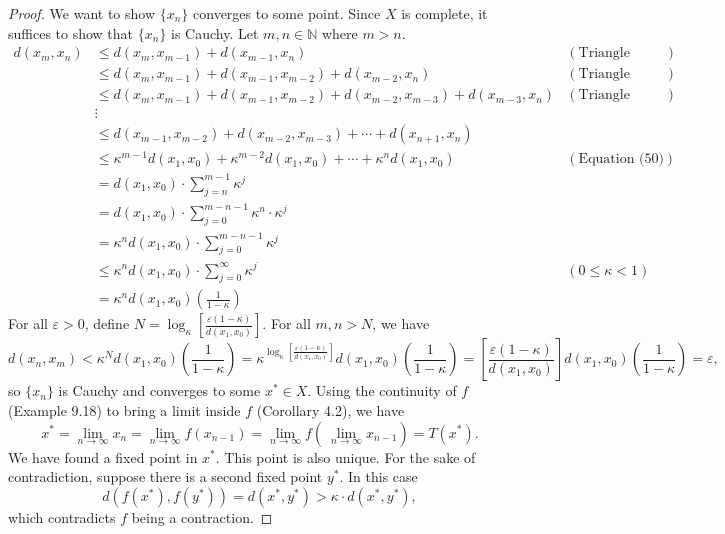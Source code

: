 \documentclass{article}
\newcommand{\N}{\mathbb{N}}
\theoremstyle{definition}
\begin{document}
\begin{proof}
		We want to show $ \{x_n\} $ converges to some point. Since $ X $ is complete, it suffices to show that $ \{x_n\}  $ is Cauchy. Let $ m,n\in\N $ where $ m > n $. 
		\begin{align*}
			d(x_m,x_n) &\le d(x_m,x_{m-1}) + d(x_{m-1}, x_n) &(\text{Triangle Inequality})\\  & \le d(x_m,x_{m-1}) + d(x_{m-1}, x_{m-2})+ d(x_{m-2}, x_n)&(\text{Triangle Inequality})\\
			&  \le d(x_m,x_{m-1}) + d(x_{m-1}, x_{m-2})+  d(x_{m-2}, x_{m-3})+ d(x_{m-3}, x_n)&(\text{Triangle Inequality})\\ & \vdots  \\  & \le  d(x_{m-1}, x_{m-2}) +d(x_{m-2}, x_{m-3})  +  \cdots + d(x_{n+1}, x_n) \\  &\le   \kappa^{m-1}d(x_1, x_0) +  \kappa^{m-2}d(x_1, x_0) + \cdots +  \kappa^{n}d(x_1, x_0)&(\text{Equation (50)})\\ & = d(x_1,x_0)\cdot \textstyle\sum_{j=n}^{m-1}\kappa^j \\ 
			& = d(x_1,x_0)\cdot \textstyle\sum_{j=0}^{m-n-1}\kappa^n\cdot \kappa^j \\
			& = \kappa^nd(x_1,x_0)\cdot \textstyle\sum_{j=0}^{m-n-1}\kappa^j  \\
			& \le \kappa^nd(x_1,x_0)\cdot \textstyle\sum_{j=0}^{\infty}\kappa^j& (0\le \kappa < 1)\\
			& = \kappa^nd(x_1,x_0)\left(\frac{1}{1-\kappa}\right)
		\end{align*}
		For all $ \varepsilon > 0 $, define $ N = \log_\kappa\left[\frac{\varepsilon(1-\kappa)}{d(x_1,x_0)}\right] $. For all $ m,n > N $, we have 
		$$ d(x_n,x_m) < \kappa^Nd(x_1,x_0)\left(\frac{1}{1-\kappa}\right) = \kappa^{\log_\kappa\left[\frac{\varepsilon(1-\kappa)}{d(x_1,x_0)}\right] }d(x_1,x_0)\left(\frac{1}{1-\kappa}\right) = \left[\frac{\varepsilon(1-\kappa)}{d(x_1,x_0)}\right]d(x_1,x_0)\left(\frac{1}{1-\kappa}\right) = \varepsilon, $$ so $ \{x_n\} $ is Cauchy and converges to some $ x^*\in X $. Using the continuity of $ f $ (Example 9.18) to bring a limit inside $ f $ (Corollary 4.2), we have $$ x^* = \lim\limits_{n\to\infty} x_n = \lim\limits_{n\to\infty} f(x_{n-1}) = \lim\limits_{n\to\infty} f\left(\ \lim\limits_{n\to\infty} x_{n-1}\right) = T(x^*).$$ We have found a fixed point in $ x^* $. This point is also unique. For the sake of contradiction, suppose there is a second fixed point $ y^* $. In this case 
		$$d(f(x^*), f(y^*))= d(x^*, y^*) > \kappa\cdot d(x^*,y^*),$$ which contradicts $ f $ being a contraction.
	\end{proof}
	
\end{document}
